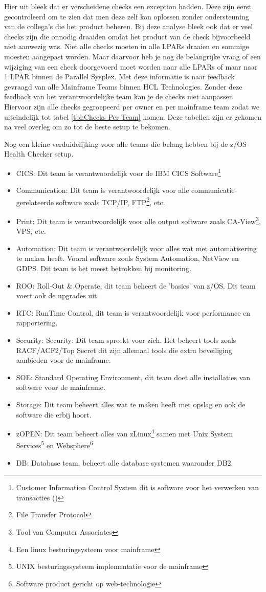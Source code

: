 Hier uit bleek dat er verscheidene checks een exception hadden. Deze zijn eerst gecontroleerd om te zien dat men deze zelf kon oplossen zonder ondersteuning van de collega's die het product beheren. Bij deze analyse bleek ook dat er veel checks zijn die onnodig draaiden omdat het product van de check bijvoorbeeld niet aanwezig was. Niet alle checks moeten in alle LPARs draaien en sommige moesten aangepast worden. Maar daarvoor heb je nog de belangrijke vraag of een wijziging van een check doorgevoerd moet worden naar alle LPARs of maar naar 1 LPAR binnen de Parallel Sysplex. Met deze informatie is naar feedback gevraagd van alle Mainframe Teams binnen HCL Technologies. Zonder deze feedback van het verantwoordelijke team kan je de checks niet aanpassen Hiervoor zijn alle checks gegroepeerd per owner en per mainframe team zodat we uiteindelijk tot tabel \ref{tbl:Checks Per Team} komen. Deze tabellen zijn er gekomen na veel overleg om zo tot de beste setup te bekomen.

Nog een kleine verduidelijking voor alle teams die belang hebben bij de z/OS Health Checker setup.
\begin{itemize}
	\item CICS: Dit team is verantwoordelijk voor de IBM CICS Software\footnote{Customer Information Control System dit is software voor het verwerken van transacties (\cite{ChrisRayns2011}) }
	\item Communication: Dit team is verantwoordelijk voor alle communicatie-gerelateerde software zoals TCP/IP, FTP\footnote{File Transfer Protocol}, etc.
	\item Print: Dit team is verantwoordelijk voor alle output software zoals CA-View\footnote{Tool van Computer Associates}, VPS, etc.
	\item Automation: Dit team is verantwoordelijk voor alles wat met automatisering te maken heeft. Vooral software zoals System Automation, NetView en GDPS. Dit team is het meest betrokken bij monitoring.
	\item ROO: Roll-Out \& Operate, dit team beheert de 'basics' van z/OS. Dit team voert ook de upgrades uit.
	\item RTC: RunTime Control, dit team is verantwoordelijk voor performance en rapportering.
	\item Security: Security: Dit team spreekt voor zich. Het beheert tools zoals RACF/ACF2/Top Secret dit zijn allemaal tools die extra beveiliging aanbieden voor de mainframe.	
	\item SOE: Standard Operating Environment, dit team doet alle installaties van software voor de mainframe.
	\item Storage: Dit team beheert alles wat te maken heeft met opslag en ook de software die erbij hoort.
	\item zOPEN: Dit team beheert alles van zLinux\footnote{Een linux besturingsysteem voor mainframe} samen met Unix System Services\footnote{UNIX besturingssysteem implementatie voor de mainframe} en Websphere\footnote{Software product gericht op web-technologie}
	\item DB: Database team, beheert alle database systemen waaronder DB2.
\end{itemize}

